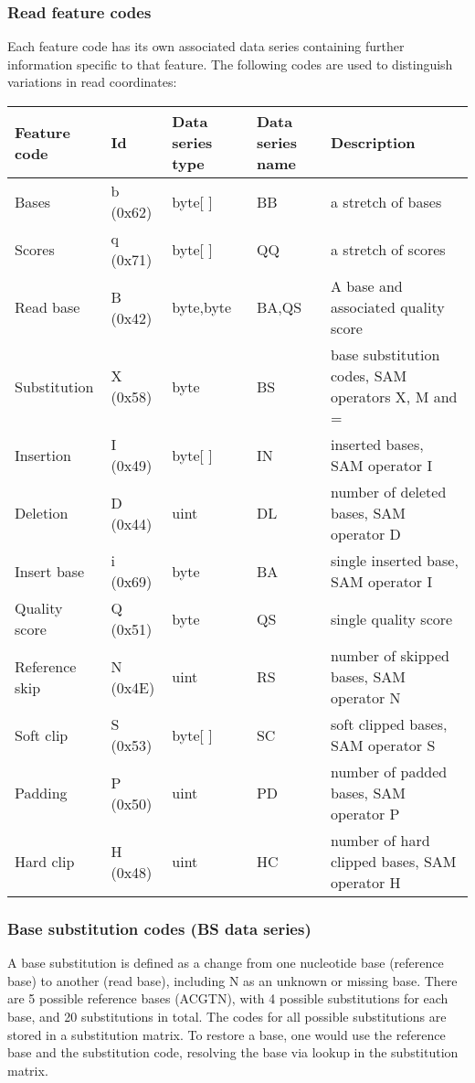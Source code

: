 \documentclass[a4paper]{article}
\begin{document}
\subsubsection*{Read feature codes}

Each feature code has its own associated data series containing further information specific to that feature.
The following codes are used to distinguish variations in read coordinates:

\begin{tabular}{|>{\raggedright}p{91pt}|>{\raggedright}p{45pt}|>{\raggedright}p{72pt}|>{\raggedright}p{66pt}|>{\raggedright}p{132pt}|}
\hline
\textbf{Feature code} & \textbf{Id} & \textbf{Data series type} & \textbf{Data 
series name} & \textbf{Description}\tabularnewline
\hline
Bases & b (0x62) & byte[ ] & BB & a stretch of bases\tabularnewline
\hline
Scores & q (0x71) & byte[ ] & QQ & a stretch of scores\tabularnewline
\hline
%
Read base & B (0x42) & byte,byte & BA,QS & A base and associated quality score\tabularnewline
\hline
Substitution & X (0x58) & byte & BS & base substitution codes, SAM operators X, 
M and =\tabularnewline
\hline
Insertion & I (0x49) & byte[ ] & IN & inserted bases, SAM operator I\tabularnewline
\hline
Deletion & D (0x44) & uint & DL & number of deleted bases, SAM operator D\tabularnewline
\hline
Insert base & i (0x69) & byte & BA & single inserted base, SAM operator I\tabularnewline
\hline
Quality score & Q (0x51) & byte & QS & single quality score\tabularnewline
\hline
Reference skip & N (0x4E) & uint & RS & number of skipped bases, SAM operator N\tabularnewline
\hline
Soft clip & S (0x53) & byte[ ] & SC & soft clipped bases, SAM operator S\tabularnewline
\hline
Padding & P (0x50) & uint & PD & number of padded bases, SAM operator P\tabularnewline
\hline
Hard clip & H (0x48) & uint & HC & number of hard clipped bases, SAM operator H\tabularnewline
\hline
\end{tabular}

\subsubsection*{Base substitution codes (BS data series)}

A base substitution is defined as a change from one nucleotide base (reference base) to
another (read base), including N as an unknown or missing base. There are 5 possible reference
bases (ACGTN), with 4 possible substitutions for each base, and 20 substitutions in total.
The codes for all possible substitutions are stored in a substitution matrix. To restore a
base, one would use the reference base and the substitution code, resolving the base via lookup
in the substitution matrix.
\end{document}
